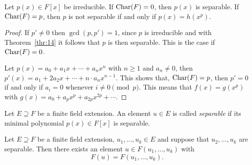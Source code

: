 \begin{theorem}
  \label{thr:15}
  Let $p(x) ∈ F[x]$ be irreducible. If $\mathrm{Char}(F) = 0$, then $p(x)$ is separable. If $\mathrm{Char}(F) = p$, then $p$ is not separable if and only if $p(x) = h(x^p)$. 
\end{theorem}

\begin{proof}
  If $p' ≠0$ then $\gcd(p,p')=1$, since $p$ is irreducible and with
  Theorem~\ref{thr:14} it follows that $p$ is then separable. This is
  the case if $\mathrm{Char}(F) = 0$.
  
  Let $p(x) = a_0 + a_1x + \cdots + a_n x^n$ with $n≥1$ and $a_n ≠0$,
  then $p'(x) = a_1 + 2a_2x + \cdots + n ⋅ a_n x^{n-1}$. This shows that,  $\mathrm{Char}(F) =p$, then $p'=0$ if and only if $a_i = 0$ whenever $i ≠ 0 \pmod{p}$. This means that $f(x) = g(x^p)$ with $g(x) = a_0 + a_px^p + a_{2p}x^{2p} + \cdots$. 
  
\end{proof}

\begin{definition}
  Let $E ⊇F$ be a finite field extension. An element $u ∈E$ is called \emph{separable} if its minimal polynomial $p(x) ∈F[x]$ is separable.
\end{definition}


\begin{theorem}
  \label{thr:16}
  Let $E ⊇ F$ be a finite field extension, $u_1,\dots,u_k ∈E$ and suppose that $u_2,\dots,u_k$ are separable. Then there exists an element $u ∈ F(u_1,\dots,u_k)$ with
  \begin{displaymath}
    F(u) =  F(u_1,\dots,u_k). 
  \end{displaymath}  
\end{theorem}

